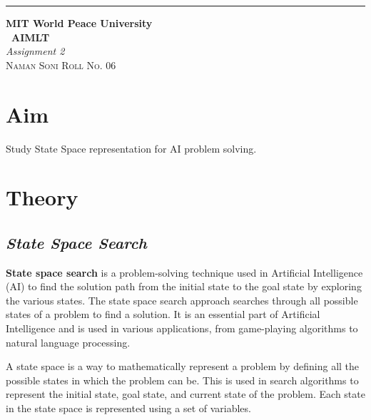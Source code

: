 \documentclass{article}
\begin{document}
\begin{titlepage} %

	\raggedleft\rule{1pt}{\textheight} %
	\hspace{0.05\textwidth} %
	\parbox[b]{0.75\textwidth}
    { %
		
		{\Huge\bfseries MIT World Peace University \\[0.5\baselineskip] \ AIMLT}\\[2\baselineskip] %
		{\large\textit{Assignment 2}}\\[4\baselineskip] %
		{\Large\textsc{Naman Soni Roll No. 06}} %
		
		\vspace{0.5\textheight} %
	}

\end{titlepage}
\tableofcontents
\pagebreak
\section{\textbf{Aim}}
Study State Space representation for AI problem solving.
\section{\textbf{Theory}}
\subsection{\textbf{\textit{State Space Search}}}
\textbf{State space search} is a problem-solving technique used in Artificial Intelligence (AI) to find the solution
path from the initial state to the goal state by exploring the various states. The state space search approach
searches through all possible states of a problem to find a solution. It is an essential part of Artificial
Intelligence and is used in various applications, from game-playing algorithms to natural language processing.

A state space is a way to mathematically represent a problem by defining all the possible states in which
the problem can be. This is used in search algorithms to represent the initial state, goal state, and current
state of the problem. Each state in the state space is represented using a set of variables.
\end{document}
